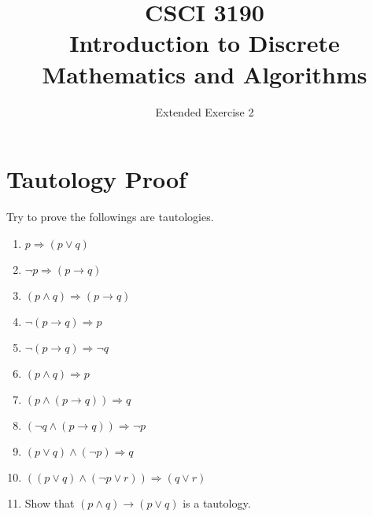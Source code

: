 \documentclass{sig-alternate-05-2015}
\begin{document}






%

\title{CSCI 3190 \\ Introduction to Discrete Mathematics and Algorithms}
\subtitle{Extended Exercise 2}

\maketitle
\begin{abstract}

\end{abstract}

\keywords{}

\section{Tautology Proof}
Try to prove the followings are tautologies.
\begin{enumerate}
\item $p\Rightarrow (p\vee q )$
\item $\neg p \Rightarrow (p\rightarrow q)$
\item $(p\wedge q)\Rightarrow (p\rightarrow q)$
\item $\neg (p\rightarrow q)\Rightarrow p$
\item $\neg (p \rightarrow q) \Rightarrow \neg q$
\item $(p\wedge q)\Rightarrow p$
\item $(p\wedge (p\rightarrow q))\Rightarrow q$
\item $(\neg q \wedge (p \rightarrow q))\Rightarrow \neg p$
\item $ (p\vee q)\wedge (\neg p) \Rightarrow q$
\item $ ((p \vee q) \wedge (\neg p \vee r)) \Rightarrow (q\vee r)$
\item Show that $(p \wedge q) \rightarrow (p \vee q)$ is a tautology.
\end{enumerate}
\end{document}
